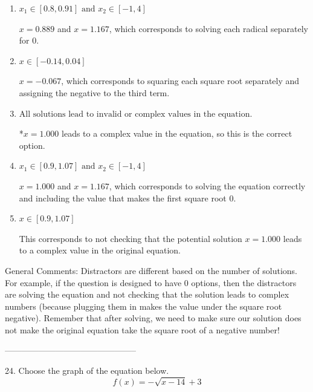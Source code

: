 \documentclass{article}[14pt]
\begin{document}
\begin{enumerate}[label=\Alph*.] 
\item $ x_1 \in [0.8, 0.91] \text{ and } x_2 \in [-1,4] $ 

 $x = 0.889$ and $x = 1.167$, which corresponds to solving each radical separately for 0. 
\item $ x \in [-0.14,0.04] $ 

 $x = -0.067$, which corresponds to squaring each square root separately and assigning the negative to the third term. 
\item $ \text{All solutions lead to invalid or complex values in the equation.} $ 

 *$x = 1.000$ leads to a complex value in the equation, so this is the correct option. 
\item $ x_1 \in [0.9, 1.07] \text{ and } x_2 \in [-1,4] $ 

 $x = 1.000$ and $x = 1.167$, which corresponds to solving the equation correctly and including the value that makes the first square root 0. 
\item $ x \in [0.9,1.07] $ 

 This corresponds to not checking that the potential solution $x = 1.000$ leads to a complex value in the original equation. 
\end{enumerate} 
 
General Comments: Distractors are different based on the number of solutions. For example, if the question is designed to have 0 options, then the distractors are solving the equation and not checking that the solution leads to complex numbers (because plugging them in makes the value under the square root negative). Remember that after solving, we need to make sure our solution does not make the original equation take the square root of a negative number!

-----------------------------------------------

24. Choose the graph of the equation below.
$$ f(x) = - \sqrt{x - 14} + 3 $$ 
\end{document}
